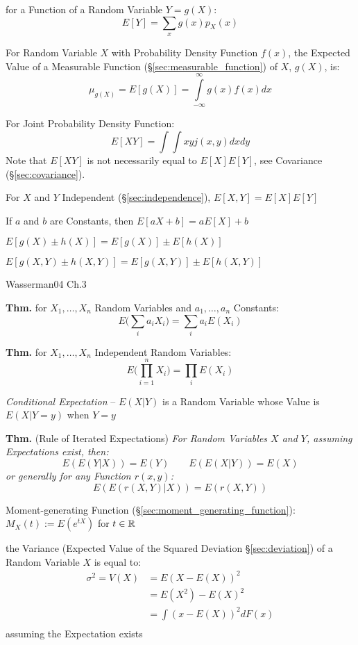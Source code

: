 for a Function of a Random Variable $Y = g(X)$:
\[
  E[Y] = \sum_x g(x) p_X(x)
\]

For Random Variable $X$ with Probability Density Function $f(x)$, the
Expected Value of a Measurable Function
(\S\ref{sec:measurable_function}) of $X$, $g(X)$, is:
\[
  \mu_{g(X)} = E[g(X)] = \int\limits_{-\infty}^{\infty} g(x) f(x) dx
\]

For Joint Probability Density Function:
\[
  E[X Y] = \int\int x y j(x,y) dx dy
\]
\fist Note that $E[X Y]$ is not necessarily equal to $E[X] E[Y]$, see Covariance
(\S\ref{sec:covariance}).

For $X$ and $Y$ Independent (\S\ref{sec:independence}), $E[X,Y] = E[X] E[Y]$

If $a$ and $b$ are Constants, then $E[aX + b] = a E[X] + b$

$E [g(X) \pm h(X)] = E[g(X)] \pm E[h(X)]$

$E [g(X,Y) \pm h(X,Y)] = E[g(X,Y)] \pm E[h(X,Y)]$

Wasserman04 Ch.3

\textbf{Thm.} for $X_1, \ldots, X_n$ Random Variables and $a_1, \ldots, a_n$
Constants:
\[
  E\Big(\sum_i a_i X_i\Big) = \sum_i a_i E(X_i)
\]

\textbf{Thm.} for $X_1, \ldots, X_n$ Independent Random Variables:
\[
  E\Big(\prod_{i=1}^n X_i\Big) = \prod_i E(X_i)
\]

\emph{Conditional Expectation} -- $E(X|Y)$ is a Random Variable whose Value is
$E(X|Y = y)$ when $Y = y$

\textbf{Thm.} (Rule of Iterated Expectations) \emph{
  For Random Variables $X$ and $Y$, assuming Expectations exist, then:
  \[
    E(E(Y|X)) = E(Y) \quad\quad E(E(X|Y)) = E(X)
  \]
  or generally for any Function $r(x,y)$:
  \[
    E(E(r(X,Y)|X)) = E(r(X,Y))
  \]
}

Moment-generating Function (\S\ref{sec:moment_generating_function}):
$M_X(t) := E(e^{tX})$ for $t \in \mathbb{R}$

the Variance (Expected Value of the Squared Deviation \S\ref{sec:deviation}) of
a Random Variable $X$ is equal to:
\begin{align*}
  \sigma^2 = V(X) & = E(X - E(X))^2   \\
                  & = E(X^2) - E(X)^2 \\
                  & = \int(x - E(X))^2 dF(x) \\
\end{align*}
assuming the Expectation exists

